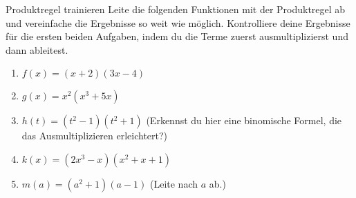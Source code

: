 \begin{aufgabenumgebung}{Produktregel trainieren}
Leite die folgenden Funktionen mit der Produktregel ab und vereinfache die Ergebnisse so weit wie möglich. Kontrolliere deine Ergebnisse für die ersten beiden Aufgaben, indem du die Terme zuerst ausmultiplizierst und dann ableitest.
\begin{enumerate}
    \item $f(x) = (x+2)(3x-4)$
    \item $g(x) = x^2(x^3+5x)$
    \item $h(t) = (t^2-1)(t^2+1)$ (Erkennst du hier eine binomische Formel, die das Ausmultiplizieren erleichtert?)
    \item $k(x) = (2x^3-x)(x^2+x+1)$
    \item $m(a) = (a^2+1)(a-1)$ (Leite nach $a$ ab.)
\end{enumerate}
\end{aufgabenumgebung}

